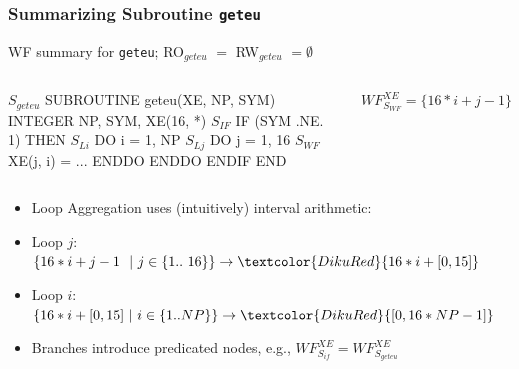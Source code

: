 \documentclass{beamer}
\renewcommand{\emph}[1]{\textcolor{structure}{#1}}
\newcommand{\emp}[1]{\textcolor{DikuRed}{ #1}}
\newcommand{\mymath}[1]{$ #1 $}
\newcommand{\myindx}[1]{_{#1}}
\newcommand{\myindu}[1]{^{#1}}
\begin{document}
\begin{frame}[fragile,t]
  \frametitle{Summarizing Subroutine {\tt geteu}}

\begin{block}{WF summary for {\tt geteu}; RO$_{geteu}$ $=$ RW$_{geteu}$ $= \emptyset$ } \vspace{-1ex}
\begin{columns} 
\begin{colorcode}[fontsize=\scriptsize]
\mymath{S\myindx{geteu}}  SUBROUTINE geteu(XE, NP, SYM)
         INTEGER NP, SYM, XE(16, *)  
\mymath{S\myindx{IF}}       \emph{IF (SYM .NE. 1) THEN}
\mymath{S\myindx{Li}}         \emp{DO i = 1, NP}
\mymath{S\myindx{Lj}}           \emp{DO j = 1, 16}
\mymath{S\myindx{WF}}             \alert{XE(j, i)} = ...
             \emp{ENDDO} 
           \emp{ENDDO}
         \emph{ENDIF}
       END
\end{colorcode}
\begin{colorcode}[fontsize=\scriptsize]








\alert{\mymath{WF\myindu{XE}\myindx{S\myindx{WF}} = \{16*i+j-1\}}}
\end{colorcode}
\end{columns}
\end{block}


\begin{itemize}
    \item Loop Aggregation uses (intuitively) interval arithmetic: \smallskip
    \item Loop $j$: $\{16*i + j - 1 \mbox{ }\mbox{ }|\mbox{ } j \in \{1..\mbox{ }16\}\} \rightarrow \emp{16*i + [0,15]}$ \smallskip
    \item Loop $i$: $\{16*i + [0,15] \mbox{ }|\mbox{ } i \in \{1..NP\}\} \rightarrow \emp{[0, 16*NP-1]}$  \smallskip
    \item Branches introduce predicated nodes, e.g., \emph{$WF^{XE}_{S_{if}} = WF^{XE}_{S_{geteu}}$} 
\end{itemize}
\end{frame}

\end{document}
